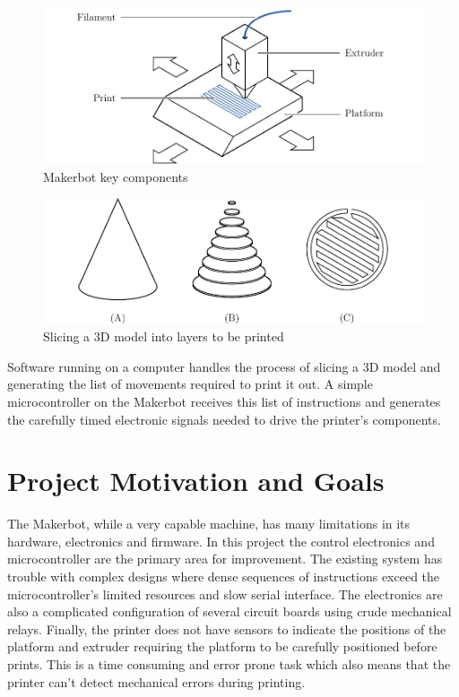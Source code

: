 		\begin{figure}
			\includegraphics[width=1\textwidth]{diagrams/printerBasics.pdf}
			\caption{Makerbot key components}
			\label{fig:printerBasics}
		\end{figure}
		
		\begin{figure}
			\includegraphics[width=1\textwidth]{diagrams/slicing.pdf}
			\caption{Slicing a 3D model into layers to be printed}
			\label{fig:slicing}
		\end{figure}
		
		Software running on a computer handles the process of slicing a 3D model and
		generating the list of movements required to print it out.  A simple
		microcontroller on the Makerbot receives this list of instructions and
		generates the carefully timed electronic signals needed to drive the
		printer's components.
		
	\section{Project Motivation and Goals}
		
		\label{sec:aims}
		
		The Makerbot, while a very capable machine, has many limitations in its
		hardware, electronics and firmware. In this project the control electronics
		and microcontroller are the primary area for improvement. The existing
		system has trouble with complex designs where dense sequences of
		instructions exceed the microcontroller's limited resources and slow serial
		interface. The electronics are also a complicated configuration of several
		circuit boards using crude mechanical relays.  Finally, the printer does
		not have sensors to indicate the positions of the platform and extruder
		requiring the platform to be carefully positioned before prints. This is a
		time consuming and error prone task which also means that the printer can't
		detect mechanical errors during printing.
		
